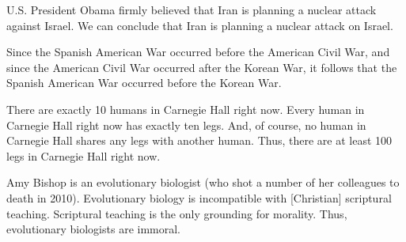 \begin{exercises}
\item U.S. President Obama firmly believed that Iran is planning a nuclear attack against Israel. We can conclude that Iran is planning a nuclear attack on Israel.


\item Since the Spanish American War occurred before the American Civil War, and since the American Civil War occurred after the Korean War, it follows that the Spanish American War occurred before the Korean War.


\item There are exactly 10 humans in Carnegie Hall right now. Every human in Carnegie Hall right now has exactly ten legs. And, of course, no human in Carnegie Hall shares any legs with another human. Thus, there are at least 100 legs in Carnegie Hall right now.


\item Amy Bishop is an evolutionary biologist (who shot a number of her colleagues to death in 2010). Evolutionary biology is incompatible with [Christian] scriptural teaching. Scriptural teaching is the only grounding for morality. Thus, evolutionary biologists are immoral.



\end{exercises}
